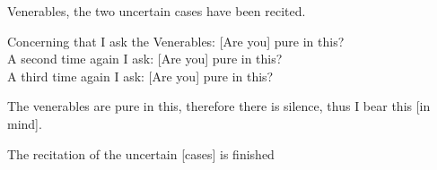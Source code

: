 \medskip

\begin{center}
	Venerables, the two uncertain cases have been recited.

	\smallskip

	Concerning that I ask the Venerables: [Are you] pure in this?\\
	A second time again I ask: [Are you] pure in this?\\
	A third time again I ask: [Are you] pure in this?

	\smallskip

	The venerables are pure in this, therefore there is silence, thus I bear this [in mind].
\end{center}

\begin{outro}
	The recitation of the uncertain [cases] is finished
\end{outro}

\clearpage

